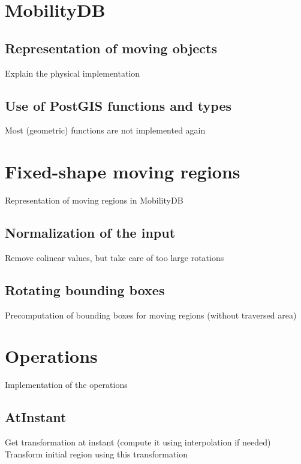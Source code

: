\section{MobilityDB}

	\subsection{Representation of moving objects}

	Explain the physical implementation

	\subsection{Use of PostGIS functions and types}

	Most (geometric) functions are not implemented again

\section{Fixed-shape moving regions}

Representation of moving regions in MobilityDB
	
	\subsection{Normalization of the input}

	Remove colinear values, but take care of too large rotations

	\subsection{Rotating bounding boxes}

	Precomputation of bounding boxes for moving regions (without traversed area)

\section{Operations}

Implementation of the operations

	\subsection{AtInstant}

	Get transformation at instant (compute it using interpolation if needed)
	Transform initial region using this transformation

